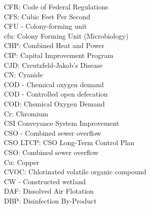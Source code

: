 \documentclass{article}
\begin{document}
CFR:  Code of Federal Regulations
\vspace{0.3cm}\\
CFS:  Cubic Feet Per Second
\vspace{0.3cm}\\
CFU - Colony-forming unit
\vspace{0.3cm}\\
cfu:  Colony Forming Unit (Microbiology)
\vspace{0.3cm}\\
CHP:  Combined Heat and Power
\vspace{0.3cm}\\
CIP:  Capital Improvement Program
\vspace{0.3cm}\\
CJD:  Creutzfeld-Jakob's Disease
\vspace{0.3cm}\\
CN:  Cyanide
\vspace{0.3cm}\\
COD - Chemical oxygen demand
\vspace{0.3cm}\\
COD - Controlled open defecation
\vspace{0.3cm}\\
COD:  Chemical Oxygen Demand 
\vspace{0.3cm}\\
Cr: Chromium
\vspace{0.3cm}\\
CSI Conveyance System Improvement
\vspace{0.3cm}\\
CSO - Combined sewer overflow 
\vspace{0.3cm}\\
CSO LTCP:  CSO Long-Term Control Plan
\vspace{0.3cm}\\
CSO:  Combined sewer overflow
\vspace{0.3cm}\\
Cu: Copper
\vspace{0.3cm}\\
CVOC:  Chlorinated volatile organic compound
\vspace{0.3cm}\\
CW - Constructed wetland
\vspace{0.3cm}\\
DAF:  Dissolved Air Flotation
\vspace{0.3cm}\\
DBP:  Disinfection By-Product
\vspace{0.3cm}\\
\end{document}
